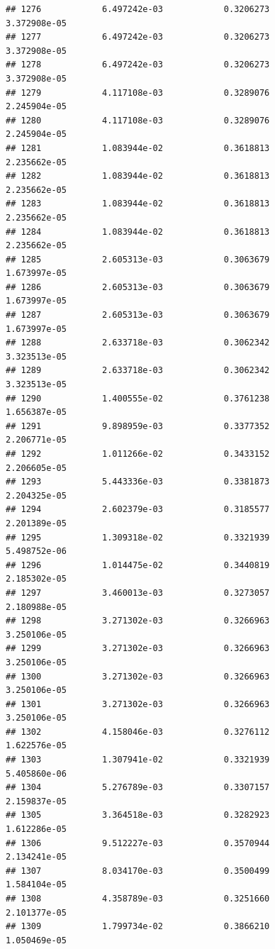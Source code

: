 \documentclass[
]{article}
\begin{document}
\begin{verbatim}
## 1276            6.497242e-03            0.3206273            3.372908e-05
## 1277            6.497242e-03            0.3206273            3.372908e-05
## 1278            6.497242e-03            0.3206273            3.372908e-05
## 1279            4.117108e-03            0.3289076            2.245904e-05
## 1280            4.117108e-03            0.3289076            2.245904e-05
## 1281            1.083944e-02            0.3618813            2.235662e-05
## 1282            1.083944e-02            0.3618813            2.235662e-05
## 1283            1.083944e-02            0.3618813            2.235662e-05
## 1284            1.083944e-02            0.3618813            2.235662e-05
## 1285            2.605313e-03            0.3063679            1.673997e-05
## 1286            2.605313e-03            0.3063679            1.673997e-05
## 1287            2.605313e-03            0.3063679            1.673997e-05
## 1288            2.633718e-03            0.3062342            3.323513e-05
## 1289            2.633718e-03            0.3062342            3.323513e-05
## 1290            1.400555e-02            0.3761238            1.656387e-05
## 1291            9.898959e-03            0.3377352            2.206771e-05
## 1292            1.011266e-02            0.3433152            2.206605e-05
## 1293            5.443336e-03            0.3381873            2.204325e-05
## 1294            2.602379e-03            0.3185577            2.201389e-05
## 1295            1.309318e-02            0.3321939            5.498752e-06
## 1296            1.014475e-02            0.3440819            2.185302e-05
## 1297            3.460013e-03            0.3273057            2.180988e-05
## 1298            3.271302e-03            0.3266963            3.250106e-05
## 1299            3.271302e-03            0.3266963            3.250106e-05
## 1300            3.271302e-03            0.3266963            3.250106e-05
## 1301            3.271302e-03            0.3266963            3.250106e-05
## 1302            4.158046e-03            0.3276112            1.622576e-05
## 1303            1.307941e-02            0.3321939            5.405860e-06
## 1304            5.276789e-03            0.3307157            2.159837e-05
## 1305            3.364518e-03            0.3282923            1.612286e-05
## 1306            9.512227e-03            0.3570944            2.134241e-05
## 1307            8.034170e-03            0.3500499            1.584104e-05
## 1308            4.358789e-03            0.3251660            2.101377e-05
## 1309            1.799734e-02            0.3866210            1.050469e-05

\end{verbatim}
\end{document}
